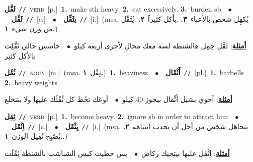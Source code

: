 \documentclass[10pt,a4paper,twoside]{article} %
\begin{document}
\begin{multicols}{2}
{\setlength\topsep{0pt}\textbf{\foreignlanguage{arabic}{ثَقَّل}}\ {\color{gray}\texttt{//}\color{black}}\ \textsc{verb}\ [p.]\ \textbf{1.}~make sth heavy.  \textbf{2.}~eat excessively.  \textbf{3.}~burden sb\ \ $\bullet$\ \ \setlength\topsep{0pt}\textbf{\foreignlanguage{arabic}{ثَقِّل}}\ {\color{gray}\texttt{//}\color{black}}\ [c.]\ \ $\bullet$\ \ \setlength\topsep{0pt}\textbf{\foreignlanguage{arabic}{يثَقِّل}}\ {\color{gray}\texttt{//}\color{black}}\ [i.]\ \color{gray}(msa. \foreignlanguage{arabic}{يُكهِل شخص بالأعباء}~\foreignlanguage{arabic}{\textbf{٣.}}  .\foreignlanguage{arabic}{يأكل كثيراََ}~\foreignlanguage{arabic}{\textbf{٢.}}  .\foreignlanguage{arabic}{يُثَقِّل من وزن شيء}~\foreignlanguage{arabic}{\textbf{١.}})\color{black}\  \begin{flushright}\color{gray}\foreignlanguage{arabic}{\textbf{\underline{\foreignlanguage{arabic}{أمثلة}}}: ثَقِّل حِمِل هالشنطة لسة معك مجال لأخرى أربعة كيلو\ $\bullet$\ \  حاسس حالي ثَقَّلِت بالأكل كثير}\end{flushright}\color{black}} \vspace{2mm}

{\setlength\topsep{0pt}\textbf{\foreignlanguage{arabic}{ثُقُل}}\ {\color{gray}\texttt{//}\color{black}}\ \textsc{noun}\ [m.]\ \color{gray}(msa. \foreignlanguage{arabic}{ثِقْل}~\foreignlanguage{arabic}{\textbf{١.}})\color{black}\ \textbf{1.}~heaviness\ \ $\bullet$\ \ \setlength\topsep{0pt}\textbf{\foreignlanguage{arabic}{أَثْقَال}}\ {\color{gray}\texttt{//}\color{black}}\ [pl.]\ \textbf{1.}~barbells  \textbf{2.}~heavy weights\  \begin{flushright}\color{gray}\foreignlanguage{arabic}{\textbf{\underline{\foreignlanguage{arabic}{أمثلة}}}: أخوي بشيل أَثْقال بيجوز 40 كيلو\ $\bullet$\ \  أوعَك تحُط كل ثُقْلَك عليها ولا بتنخلع}\end{flushright}\color{black}} \vspace{2mm}

{\setlength\topsep{0pt}\textbf{\foreignlanguage{arabic}{ثِقِل}}\ {\color{gray}\texttt{//}\color{black}}\ \textsc{verb}\ [p.]\ \textbf{1.}~become heavy.  \textbf{2.}~ignore sb in order to attract him\ \ $\bullet$\ \ \setlength\topsep{0pt}\textbf{\foreignlanguage{arabic}{اِثْقَل}}\ {\color{gray}\texttt{//}\color{black}}\ [c.]\ \ $\bullet$\ \ \setlength\topsep{0pt}\textbf{\foreignlanguage{arabic}{يِثْقَل}}\ {\color{gray}\texttt{//}\color{black}}\ [i.]\ \color{gray}(msa. \foreignlanguage{arabic}{يتجاهَل شخص من أجل أن يجذب انتباهه}~\foreignlanguage{arabic}{\textbf{٢.}}  .\foreignlanguage{arabic}{يُصْبِح ثَقِيل الوزن}~\foreignlanguage{arabic}{\textbf{١.}})\color{black}\  \begin{flushright}\color{gray}\foreignlanguage{arabic}{\textbf{\underline{\foreignlanguage{arabic}{أمثلة}}}: اِثْقَل عليها بيتجيك ركاض\ $\bullet$\ \  بس حطيت كيس الشباشب بالشنطة ثِقْلَت}\end{flushright}\color{black}} \vspace{2mm}


\end{multicols}
\end{document}
